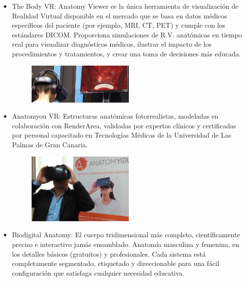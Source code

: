 \begin{itemize}
\item The Body VR: Anatomy Viewer es la única herramienta de visualización de Realidad Virtual disponible en el mercado que se basa en datos médicos específicos del paciente (por ejemplo, MRI, CT, PET) y cumple con los estándares DICOM. Proporciona simulaciones de R.V. anatómicas en tiempo real para visualizar diagnósticos médicos, ilustrar el impacto de los procedimientos y tratamientos, y crear una toma de decisiones más educada.\
\begin{figure}[H]
	\begin{center}
 		\includegraphics[width = 0.5\textwidth]{source/images/image9.png}
	\end{center} 
\end{figure}
\item Anatomyou VR: Estructuras anatómicas fotorrealistas, modeladas en colaboración con RenderArea, validadas por expertos clínicos y certificadas por personal capacitado en  Tecnologías Médicas de la Universidad de Las Palmas de Gran Canaria.
\begin{figure}[H]
	\begin{center}
 		\includegraphics[width = 0.5\textwidth]{source/images/image59.png}
	\end{center} 
\end{figure}
\item Biodigital Anatomy: El cuerpo tridimensional más completo, científicamente preciso e interactivo jamás ensamblado. Anatomía masculina y femenina, en los detalles básicos (gratuitos) y profesionales. Cada sistema está completamente segmentado, etiquetado y direccionable para una fácil configuración que satisfaga cualquier necesidad educativa.

\end{itemize}
